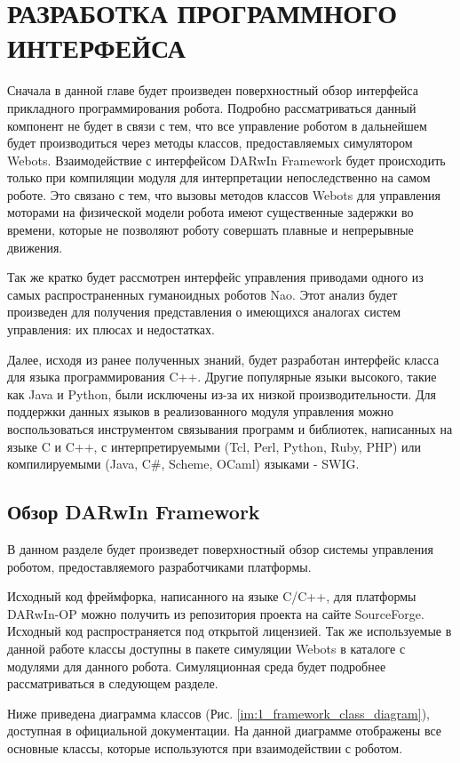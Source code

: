 \chapter{РАЗРАБОТКА ПРОГРАММНОГО ИНТЕРФЕЙСА}

Сначала в данной главе будет произведен поверхностный обзор интерфейса прикладного программирования робота. Подробно рассматриваться данный компонент не будет в связи с тем, что все управление роботом в дальнейшем будет производиться через методы классов, предоставляемых симулятором Webots. Взаимодействие с интерфейсом DARwIn Framework будет происходить только при компиляции модуля для интерпретации непоследственно на самом роботе. Это связано с тем, что вызовы методов классов Webots для управления моторами на физической модели робота имеют существенные задержки во времени, которые не позволяют роботу совершать плавные и непрерывные движения.

Так же кратко будет рассмотрен интерфейс управления приводами одного из самых распространенных гуманоидных роботов Nao. Этот анализ будет произведен для получения представления о имеющихся аналогах систем управления: их плюсах и недостатках.

Далее, исходя из ранее полученных знаний, будет разработан интерфейс класса для языка программирования C++. Другие популярные языки высокого, такие как Java и Python, были исключены из-за их низкой производительности. Для поддержки данных языков в реализованного модуля управления можно воспользоваться инструментом связывания программ и библиотек, написанных на языке C и C++, с интерпретируемыми (Tcl, Perl, Python, Ruby, PHP) или компилируемыми (Java, C\#, Scheme, OCaml) языками - SWIG.


\section{Обзор DARwIn Framework}

В данном разделе будет произведет поверхностный обзор системы управления роботом, предоставляемого разработчиками платформы.

Исходный код фреймфорка, написанного на языке C/C++, для платформы DARwIn-OP можно получить из репозитория проекта на сайте SourceForge. Исходный код распространяется под открытой лицензией. Так же используемые в данной работе классы доступны в пакете симуляции Webots в каталоге с модулями для данного робота. Симуляционная среда будет подробнее рассматриваться в следующем разделе.

Ниже приведена диаграмма классов (Рис. \ref{im:1_framework_class_diagram}), доступная в официальной документации. На данной диаграмме отображены все основные классы, которые используются при взаимодействии с роботом. %

